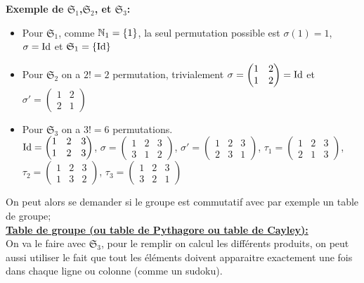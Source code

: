 \textbf{Exemple de $\mathfrak{S}_1$,$\mathfrak{S}_2$, et $\mathfrak{S}_3$:}
\begin{itemize}
	\item Pour $\mathfrak{S}_1$, comme $\mathbb{N}_1=\{1\}$, la seul permutation possible est $\sigma(1)=1$, $\sigma=\operatorname{Id}$ et $\mathfrak{S}_1=\{\operatorname{Id}\}$\\
	\item Pour $\mathfrak{S}_2$ on a $2!=2$ permutation, trivialement $\sigma=\begin{pmatrix}
		1 & 2  \\
		1 & 2  
	\end{pmatrix}=\operatorname{Id}$ et $\sigma'=\begin{pmatrix}
	1 & 2  \\
	2 & 1 
\end{pmatrix}$\\
\item Pour $\mathfrak{S}_3$ on a $3!=6$ permutations.\\

$\operatorname{Id}=\begin{pmatrix}
	1 & 2 & 3  \\
	1 & 2 & 3 
\end{pmatrix}$, $\sigma=\begin{pmatrix}
1 & 2 & 3  \\
3 & 1 & 2 
\end{pmatrix}$, $\sigma'=\begin{pmatrix}
1 & 2 & 3  \\
2 & 3 & 1 
\end{pmatrix}$, $\tau_1=\begin{pmatrix}
1 & 2 & 3  \\
2 & 1 & 3 
\end{pmatrix}$, $\tau_2=\begin{pmatrix}
1 & 2 & 3  \\
1 & 3 & 2 
\end{pmatrix}$, $\tau_3=\begin{pmatrix}
1 & 2 & 3  \\
3 & 2 & 1
\end{pmatrix}$
\end{itemize}
On peut alors se demander si le groupe est commutatif avec par exemple un table de groupe;\\
\textbf{\underline{Table de groupe (ou table de Pythagore ou table de Cayley):}\\}
On va le faire avec $\mathfrak{S}_3$, pour le remplir on calcul les différents produits, on peut aussi utiliser le fait que tout les éléments doivent apparaitre exactement une fois dans chaque ligne ou colonne (comme un sudoku).\\
